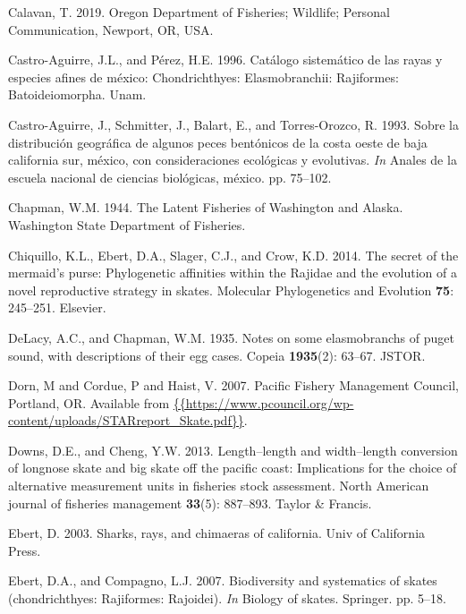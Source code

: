 \documentclass[12pt,]{article}
\begin{document}
\leavevmode\hypertarget{ref-TedCalavan}{}%
Calavan, T. 2019. Oregon Department of Fisheries; Wildlife; Personal
Communication, Newport, OR, USA.

\leavevmode\hypertarget{ref-Castro1996}{}%
Castro-Aguirre, J.L., and Pérez, H.E. 1996. Catálogo sistemático de las
rayas y especies afines de méxico: Chondrichthyes: Elasmobranchii:
Rajiformes: Batoideiomorpha. Unam.

\leavevmode\hypertarget{ref-Castro1993}{}%
Castro-Aguirre, J., Schmitter, J., Balart, E., and Torres-Orozco, R.
1993. Sobre la distribución geográfica de algunos peces bentónicos de la
costa oeste de baja california sur, méxico, con consideraciones
ecológicas y evolutivas. \emph{In} Anales de la escuela nacional de
ciencias biológicas, méxico. pp. 75--102.

\leavevmode\hypertarget{ref-Chapman1944}{}%
Chapman, W.M. 1944. The Latent Fisheries of Washington and Alaska.
Washington State Department of Fisheries.

\leavevmode\hypertarget{ref-Chiquillo2014}{}%
Chiquillo, K.L., Ebert, D.A., Slager, C.J., and Crow, K.D. 2014. The
secret of the mermaid's purse: Phylogenetic affinities within the
Rajidae and the evolution of a novel reproductive strategy in skates.
Molecular Phylogenetics and Evolution \textbf{75}: 245--251. Elsevier.

\leavevmode\hypertarget{ref-DeLacy1935}{}%
DeLacy, A.C., and Chapman, W.M. 1935. Notes on some elasmobranchs of
puget sound, with descriptions of their egg cases. Copeia
\textbf{1935}(2): 63--67. JSTOR.

\leavevmode\hypertarget{ref-Dorn2007}{}%
Dorn, M and Cordue, P and Haist, V. 2007. Pacific Fishery Management
Council, Portland, OR. Available from
\href{\%7B\%7Bhttps://www.pcouncil.org/wp-content/uploads/STARreport_Skate.pdf\%7D\%7D}{\{\{https://www.pcouncil.org/wp-content/uploads/STARreport\_Skate.pdf\}\}}.

\leavevmode\hypertarget{ref-Downs2013}{}%
Downs, D.E., and Cheng, Y.W. 2013. Length--length and width--length
conversion of longnose skate and big skate off the pacific coast:
Implications for the choice of alternative measurement units in
fisheries stock assessment. North American journal of fisheries
management \textbf{33}(5): 887--893. Taylor \& Francis.

\leavevmode\hypertarget{ref-Ebert2003}{}%
Ebert, D. 2003. Sharks, rays, and chimaeras of california. Univ of
California Press.

\leavevmode\hypertarget{ref-Ebert2007}{}%
Ebert, D.A., and Compagno, L.J. 2007. Biodiversity and systematics of
skates (chondrichthyes: Rajiformes: Rajoidei). \emph{In} Biology of
skates. Springer. pp. 5--18.
\end{document}

